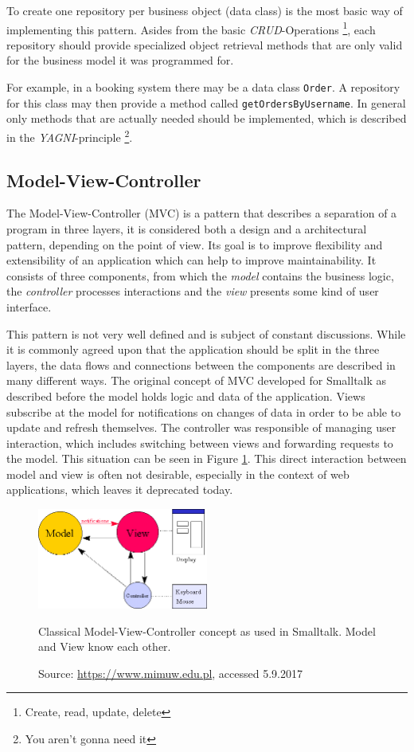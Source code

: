 To create one repository per business object (data class) is the most basic way of implementing this pattern. Asides from the basic \emph{CRUD}-Operations \footnote{Create, read, update, delete}, each repository should provide specialized object retrieval methods that are only valid for the business model it was programmed for. 

For example, in a booking system there may be a data class \texttt{Order}. A repository for this class may then provide a method called \texttt{getOrdersByUsername}. In general only methods that are actually needed should be implemented, which is described in the \emph{YAGNI}-principle \footnote{You aren't gonna need it}.


\subsection{Model-View-Controller}
\label{sec:mvc}
The Model-View-Controller (MVC) is a pattern that describes a separation of a program in three layers, it is considered both a design and a architectural pattern, depending on the point of view.  Its goal is to improve flexibility and extensibility of an application which can help to improve maintainability. It consists of three components, from which the \emph{model} contains the business logic, the \emph{controller} processes interactions and the \emph{view} presents some kind of user interface. 

This pattern is not very well defined and is subject of constant discussions. While it is commonly agreed upon that the application should be split in the three layers, the data flows and connections between the components are described in many different ways. The original concept of MVC developed for Smalltalk as described before the model holds logic and data of the application. Views subscribe at the model for notifications on changes of data in order to be able to update and refresh themselves. The controller was responsible of managing user interaction, which includes switching between views and forwarding requests to the model. This situation can be seen in Figure \ref{fig:mvc-smalltalk}. This direct interaction between model and view is often not desirable, especially in the context of web applications, which leaves it deprecated today. 

\begin{figure}[htbp]
	\centering
	\label{fig:mvc-smalltalk}
	
	\includegraphics[width=0.5\textwidth]{./content/pictures/mvc-smalltalk.jpg}
	\caption{Classical Model-View-Controller concept as used in Smalltalk. Model and View know each other.}
	\caption*{Source: \href{https://www.mimuw.edu.pl/\~sl/teaching/00\_01/Delfin\_EC/Overviews/MVC.htm}{https://www.mimuw.edu.pl}, accessed 5.9.2017}
\end{figure}

